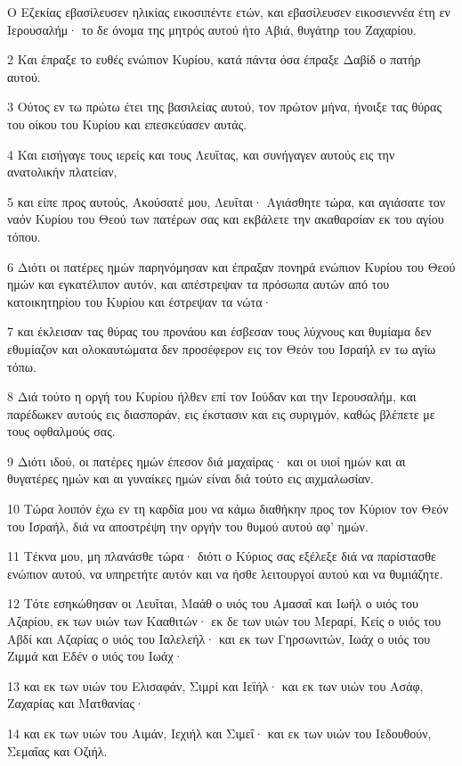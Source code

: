 \par Ο Εζεκίας εβασίλευσεν ηλικίας εικοσιπέντε ετών, και εβασίλευσεν εικοσιεννέα έτη εν Ιερουσαλήμ· το δε όνομα της μητρός αυτού ήτο Αβιά, θυγάτηρ του Ζαχαρίου.
\par 2 Και έπραξε το ευθές ενώπιον Κυρίου, κατά πάντα όσα έπραξε Δαβίδ ο πατήρ αυτού.
\par 3 Ούτος εν τω πρώτω έτει της βασιλείας αυτού, τον πρώτον μήνα, ήνοιξε τας θύρας του οίκου του Κυρίου και επεσκεύασεν αυτάς.
\par 4 Και εισήγαγε τους ιερείς και τους Λευΐτας, και συνήγαγεν αυτούς εις την ανατολικήν πλατείαν,
\par 5 και είπε προς αυτούς, Ακούσατέ μου, Λευΐται· Αγιάσθητε τώρα, και αγιάσατε τον ναόν Κυρίου του Θεού των πατέρων σας και εκβάλετε την ακαθαρσίαν εκ του αγίου τόπου.
\par 6 Διότι οι πατέρες ημών παρηνόμησαν και έπραξαν πονηρά ενώπιον Κυρίου του Θεού ημών και εγκατέλιπον αυτόν, και απέστρεψαν τα πρόσωπα αυτών από του κατοικητηρίου του Κυρίου και έστρεψαν τα νώτα·
\par 7 και έκλεισαν τας θύρας του προνάου και έσβεσαν τους λύχνους και θυμίαμα δεν εθυμίαζον και ολοκαυτώματα δεν προσέφερον εις τον Θεόν του Ισραήλ εν τω αγίω τόπω.
\par 8 Διά τούτο η οργή του Κυρίου ήλθεν επί τον Ιούδαν και την Ιερουσαλήμ, και παρέδωκεν αυτούς εις διασποράν, εις έκστασιν και εις συριγμόν, καθώς βλέπετε με τους οφθαλμούς σας.
\par 9 Διότι ιδού, οι πατέρες ημών έπεσον διά μαχαίρας· και οι υιοί ημών και αι θυγατέρες ημών και αι γυναίκες ημών είναι διά τούτο εις αιχμαλωσίαν.
\par 10 Τώρα λοιπόν έχω εν τη καρδία μου να κάμω διαθήκην προς τον Κύριον τον Θεόν του Ισραήλ, διά να αποστρέψη την οργήν του θυμού αυτού αφ' ημών.
\par 11 Τέκνα μου, μη πλανάσθε τώρα· διότι ο Κύριος σας εξέλεξε διά να παρίστασθε ενώπιον αυτού, να υπηρετήτε αυτόν και να ήσθε λειτουργοί αυτού και να θυμιάζητε.
\par 12 Τότε εσηκώθησαν οι Λευΐται, Μαάθ ο υιός του Αμασαΐ και Ιωήλ ο υιός του Αζαρίου, εκ των υιών των Κααθιτών· εκ δε των υιών του Μεραρί, Κείς ο υιός του Αβδί και Αζαρίας ο υιός του Ιαλελεήλ· και εκ των Γηρσωνιτών, Ιωάχ ο υιός του Ζιμμά και Εδέν ο υιός του Ιωάχ·
\par 13 και εκ των υιών του Ελισαφάν, Σιμρί και Ιεϊήλ· και εκ των υιών του Ασάφ, Ζαχαρίας και Ματθανίας·
\par 14 και εκ των υιών του Αιμάν, Ιεχιήλ και Σιμεΐ· και εκ των υιών του Ιεδουθούν, Σεμαΐας και Οζιήλ.
